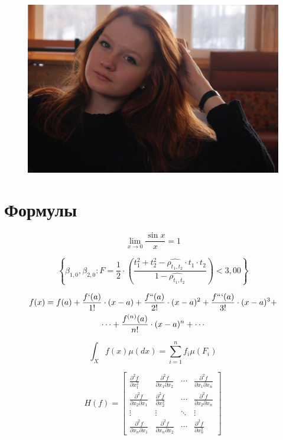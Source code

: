 \documentclass[12pt, a4paper]{article}
\begin{document}
\begin{figure}[h]
	\centering
	\includegraphics[scale=0.3]{image1.jpg}
\end{figure}

\section{Формулы}

 \begin{equation}
 \lim\limits_{x \to 0} \frac{\sin x}{x} = 1 \label{æ}
 \end{equation}
	
\begin{equation}
 \left\lbrace \beta_{1,0}, \beta_{2,0} : F = \frac{1}{2} \cdot \left(\frac{t^2_1 + t^2_2 - \hat{\rho_{t_1,t_2}} \cdot t_1 \cdot t_2 }{1 - \hat{\rho_{t_1,t_2}}}\right)  < 3,00\right\rbrace  \label{ææ}
\end{equation}


\begin{multline}
f(x) = f(a) + \frac{f`(a)}{1!} \cdot (x-a) + \frac{f``(a)}{2!} \cdot (x-a)^2 + \frac{f```(a)}{3!} \cdot (x-a)^3 + \\
\cdots + \frac{f^{(n)}(a)}{n!} \cdot (x-a)^n + \cdots \label{æææ}
\end{multline}

\begin{equation}
\int_{X} f(x) \mu(dx) = \sum_{i=1}^{n} f_i \mu(F_i) \label{ææææ}
\end{equation}
	
\begin{equation} H(f) = 
 \begin{bmatrix}
	\frac{\partial^2f}{\partial x^2_1} & \frac{\partial^2 f}{\partial x_1 \partial x_2} & \cdots & \frac{\partial^2 f}{\partial x_1 \partial x_n} \\
	\frac{\partial^2 f}{\partial x_2 \partial x_1} & \frac{\partial^2 f}{\partial x^2_2} & \cdots & \frac{\partial^2 f}{\partial x_2 \partial x_n} \\
	\vdots  & \vdots  & \ddots & \vdots  \\
	\frac{\partial^2 f}{\partial x_n \partial x_1} & \frac{\partial^2 f}{\partial x_n \partial x_2} & \cdots & \frac{\partial^2 f}{\partial x^2_n} \label{æææææ}
\end{bmatrix}
\end{equation}
\end{document}
